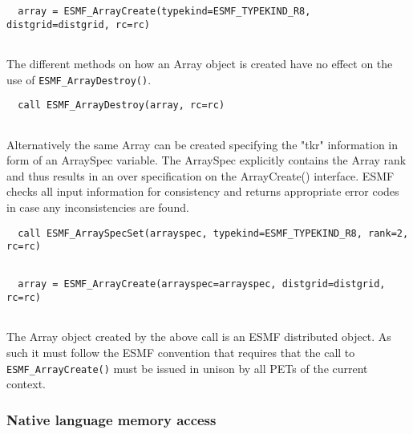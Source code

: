  \begin{verbatim}
  array = ESMF_ArrayCreate(typekind=ESMF_TYPEKIND_R8, distgrid=distgrid, rc=rc)
 
\end{verbatim}
 

   The different methods on how an Array object is created have no effect on
   the use of {\tt ESMF\_ArrayDestroy()}. 

 \begin{verbatim}
  call ESMF_ArrayDestroy(array, rc=rc)
 
\end{verbatim}
 

   Alternatively the same Array can be created specifying the "tkr" information
   in form of an ArraySpec variable. The ArraySpec explicitly contains the 
   Array rank and thus results in an over specification on the ArrayCreate()
   interface. ESMF checks all input information for consistency and returns 
   appropriate error codes in case any inconsistencies are found. 

 \begin{verbatim}
  call ESMF_ArraySpecSet(arrayspec, typekind=ESMF_TYPEKIND_R8, rank=2, rc=rc)
 
\end{verbatim}
 

 \begin{verbatim}
  array = ESMF_ArrayCreate(arrayspec=arrayspec, distgrid=distgrid, rc=rc)
 
\end{verbatim}
 

   The Array object created by the above call is an ESMF distributed 
   object. As such it must follow the ESMF convention that requires that 
   the call to {\tt ESMF\_ArrayCreate()} must be issued in unison by all 
   PETs of the current context.
  
 
   \subsubsection{Native language memory access}
   \label{Array_native_language_localde}
  
